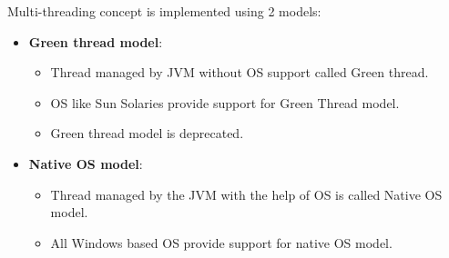 \setlength{\columnsep}{3pt}
\begin{flushleft}
	Multi-threading concept is implemented using 2 models:
	\begin{itemize}
		\item \textbf{Green thread model}:
		\begin{itemize}
			\item Thread managed by JVM without OS support called Green thread.
			\item OS like Sun Solaries provide support for Green Thread model.
			\item Green thread model is deprecated.
		\end{itemize}
	
		\item \textbf{Native OS model}:
		\begin{itemize}
			\item Thread managed by the JVM with the help of OS is called Native OS model.
			\item All Windows based OS provide support for native OS model.
		\end{itemize}
	\end{itemize}
\end{flushleft}
\newpage